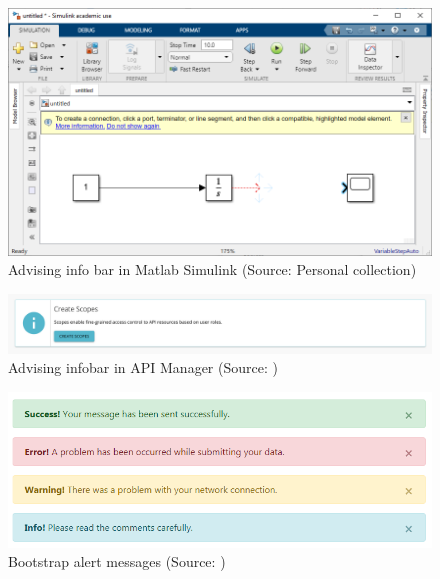 \documentclass[a4paper,10pt,twoside]{article}
\begin{document}
\vspace{0.3cm}
\begin{figure}[hbt!] 
\begin{center}
\includegraphics[width=17cm]{../pictures/info_advice_infobar.png} 
\caption[Advising info bar in Matlab Simulink]{Advising  info bar in Matlab Simulink (Source: Personal collection)}
\label{fig:info_advice_infobar}
\end{center}
\end{figure}

\vspace{0.3cm}
\begin{figure}[hbt!] 
\begin{center}
\includegraphics[width=16cm]{../pictures/info_infobar_1.png} 
\caption[Advising info bar in API Manager]{Advising infobar in API Manager (Source: \cite{githubio})}
\label{fig:info_infobar_1}
\end{center}
\end{figure}

\vspace{0.3cm}
\begin{figure}[hbt!] 
\begin{center}
\includegraphics[width=15cm]{../pictures/bootstrap_infobar.png} 
\caption[Bootstrap alert messages]{Bootstrap alert messages (Source: \cite{bootstrap})}
\label{fig:bootstrap_infobar}
\end{center}
\end{figure}
\end{document}
